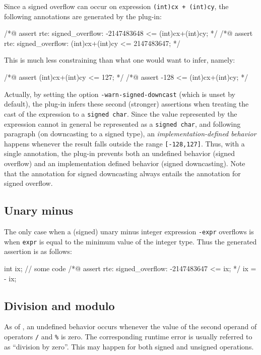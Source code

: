 Since a signed overflow can occur on expression \lstinline|(int)cx + (int)cy|,
the following annotations are generated by the \rte{} plug-in:
\begin{listing-nonumber}
/*@ assert rte: signed_overflow: -2147483648 <= (int)cx+(int)cy; */
/*@ assert rte: signed_overflow: (int)cx+(int)cy <= 2147483647; */
\end{listing-nonumber}

This is much less constraining than what one would want to infer, namely:
\begin{listing-nonumber}
/*@ assert (int)cx+(int)cy <= 127; */
/*@ assert -128 <= (int)cx+(int)cy; */
\end{listing-nonumber}

Actually, by setting the option \texttt{-warn-signed-downcast} (which is unset
by default), the \rte{} plug-in infers these second (stronger) assertions when
treating the cast of the expression to a \lstinline|signed char|.  Since the
value represented by the expression cannot in general be represented as a
\lstinline|signed char|, and following paragraph  (on
downcasting to a signed type), an {\it implementation-defined behavior} happens
whenever the result falls outside the range \lstinline|[-128,127]|.  Thus, with
a single annotation, the \rte{} plug-in prevents both an undefined behavior
(signed overflow) and an implementation defined behavior (signed downcasting).
Note that the annotation for signed downcasting always entails the annotation
for signed overflow.

\subsection{Unary minus}

The only case when a (signed) unary minus integer expression \lstinline|-expr|
overflows is when \lstinline|expr| is equal to the minimum value of the integer
type. Thus the generated assertion is as follows:
\begin{listing-nonumber}
int ix;
// some code
/*@ assert rte: signed_overflow: -2147483647 <= ix; */
ix = - ix;
\end{listing-nonumber}

\subsection{Division and modulo}

As of , an undefined behavior occurs whenever the
value of the second operand of operators \lstinline|/| and \lstinline|%| is
zero. The corresponding runtime error is usually referred to as ``division by
zero''.  This may happen for both signed and unsigned operations.


